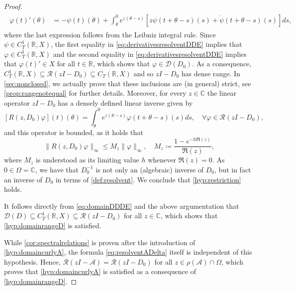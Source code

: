 \documentclass[english]{myarticle}
\begin{document}
\begin{sloppypar}
\begin{proof}
\begin{align}
\begin{split}
    \varphi(t)'(\theta) &= - \psi(t)(\theta) + \int_\theta^0 e^{z(\theta - s)} [z \psi(t+\theta-s)(s) + \dot{\psi}(t+\theta-s)(s)] ds,
\end{split}
\end{align}
where the last expression follows from the Leibniz integral rule. Since $\psi \in C_T^1(\mathbb{R},X)$, the first equality in \eqref{eq:derivativesresolventDDE} implies that $\varphi \in C_T^1(\mathbb{R},X)$ and the second equality in \eqref{eq:derivativesresolventDDE} implies that $\varphi(t)' \in X$ for all $t \in \mathbb{R}$, which shows that $\varphi \in \mathcal{D}(D_0)$. As a consequence, $C_T^1(\mathbb{R},X) \subseteq \mathcal{R}(zI - D_0) \subseteq C_T(\mathbb{R},X)$ and so $zI - D_0$ has dense range. In \cref{sec:nonclosed}, we actually prove that these inclusions are (in general) strict, see \cref{prop:rangenotequal} for further details. Moreover, for every $z \in \mathbb{C}$ the linear operator $zI - D_0$ has a densely defined linear inverse given by
\begin{equation} \label{eq:resolventD0}
    [R(z,D_0) \varphi](t)(\theta) = \int_\theta^0 e^{z(\theta - s)} \varphi(t+\theta-s)(s) ds, \quad \forall \varphi \in \mathcal{R}(zI - D_0),
\end{equation}
and this operator is bounded, as it holds that
\begin{equation} \label{eq:resolventD0Mz}
    \|R(z,D_0) \varphi \|_{\infty} \leq M_z \| \varphi \|_{\infty}, \quad M_z \coloneqq \frac{1 - e^{-h \Re(z)}}{\Re(z)},
\end{equation}
where $M_z$ is understood as its limiting value $h$ whenever $\Re(z) = 0$. As $0 \in \Omega = \mathbb{C}$, we have that $D_0^{-1}$ is not only an (algebraic) inverse of $D_0$, but in fact an inverse of $D_0$ in terms of \cref{def:resolvent}. We conclude that \ref{hyp:restriction} holds.

It follows directly from \eqref{eq:domainDDDE} and the above argumentation that $\mathcal{D}(D) \subseteq C_T^1(\mathbb{R},X) \subseteq \mathcal{R}(zI-D_0)$ for all $z \in \mathbb{C}$, which shows that \ref{hyp:domainrangeD} is satisfied. 

While \cref{cor:spectralrelations} is proven after the introduction of \ref{hyp:domaincurlyA}, the formula \eqref{eq:resolventADelta} itself is independent of this hypothesis. Hence, $\mathcal{R}(zI-\mathcal{A}) = \mathcal{R}(zI-D_0)$ for all $z \in \rho(\mathcal{A}) \cap \Omega$, which proves that \ref{hyp:domaincurlyA} is satisfied as a consequence of \ref{hyp:domainrangeD}.


\end{proof}
\end{sloppypar}
\end{document}
